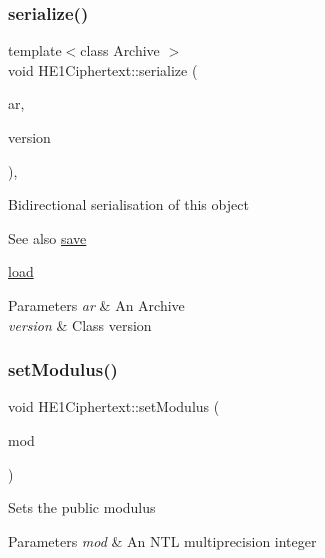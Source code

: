 \subsubsection{\texorpdfstring{serialize()}{serialize()}}
{\footnotesize\ttfamily template$<$class Archive $>$ \\
void H\+E1\+Ciphertext\+::serialize (\begin{DoxyParamCaption}\item[{Archive \&}]{ar,  }\item[{const unsigned int}]{version }\end{DoxyParamCaption})\hspace{0.3cm}{\ttfamily [inline]}, {\ttfamily [private]}}

Bidirectional serialisation of this object \begin{DoxySeeAlso}{See also}
\hyperlink{classHE1Ciphertext_a2868e8110f81031f5e6263e97a3232c0}{save} 

\hyperlink{classHE1Ciphertext_a8a9024694e1826459a53be0c7a82925e}{load} 
\end{DoxySeeAlso}

\begin{DoxyParams}{Parameters}
{\em ar} & An Archive \\
\hline
{\em version} & Class version \\
\hline
\end{DoxyParams}
\mbox{\label{classHE1Ciphertext_a3cf78bc8d18c72fbb8bd116447371bf2}} 
\subsubsection{\texorpdfstring{set\+Modulus()}{setModulus()}\hspace{0.1cm}{\footnotesize\ttfamily [1/2]}}
{\footnotesize\ttfamily void H\+E1\+Ciphertext\+::set\+Modulus (\begin{DoxyParamCaption}\item[{N\+T\+L\+::\+ZZ \&}]{mod }\end{DoxyParamCaption})\hspace{0.3cm}{\ttfamily [static]}}

Sets the public modulus 
\begin{DoxyParams}{Parameters}
{\em mod} & An N\+TL multiprecision integer \\
\hline
\end{DoxyParams}
\mbox{\label{classHE1Ciphertext_a7b9c00baa1bfa692cfa518f98a46da78}} 
